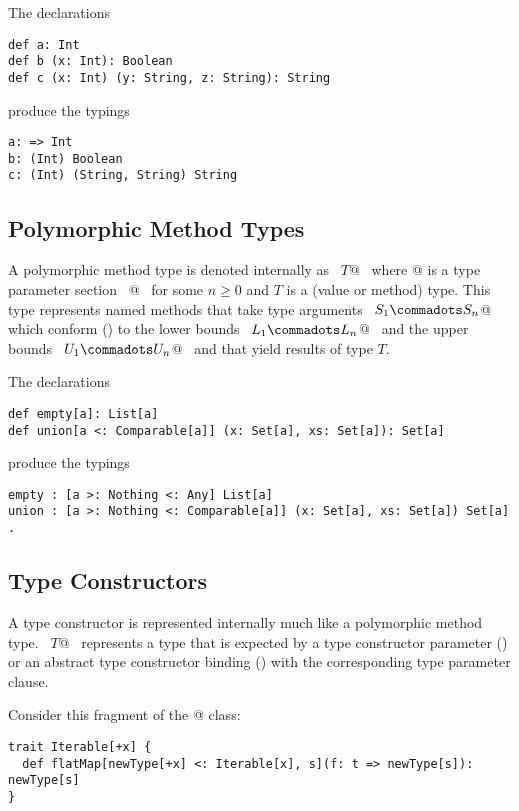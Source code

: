 \example The declarations
\begin{lstlisting}
def a: Int
def b (x: Int): Boolean
def c (x: Int) (y: String, z: String): String
\end{lstlisting}
produce the typings
\begin{lstlisting}
a: => Int
b: (Int) Boolean
c: (Int) (String, String) String
\end{lstlisting}

\subsection{Polymorphic Method Types}
\label{sec:poly-types}

A polymorphic method type is denoted internally as ~\lstinline@[$\tps\,$]$T$@~ where
\lstinline@[$\tps\,$]@ is a type parameter section 
~\lstinline@[$a_1$ >: $L_1$ <: $U_1 \commadots a_n$ >: $L_n$ <: $U_n$]@~ 
for some $n \geq 0$ and $T$ is a
(value or method) type.  This type represents named methods that
take type arguments ~\lstinline@$S_1 \commadots S_n$@~ which
conform () to the lower bounds
~\lstinline@$L_1 \commadots L_n$@~ and the upper bounds
~\lstinline@$U_1 \commadots U_n$@~ and that yield results of type $T$.

\example The declarations
\begin{lstlisting}
def empty[a]: List[a]
def union[a <: Comparable[a]] (x: Set[a], xs: Set[a]): Set[a]
\end{lstlisting}
produce the typings
\begin{lstlisting}
empty : [a >: Nothing <: Any] List[a]
union : [a >: Nothing <: Comparable[a]] (x: Set[a], xs: Set[a]) Set[a]  .
\end{lstlisting}

\subsection{Type Constructors} %
\label{sec:higherkinded-types}
A type constructor is represented internally much like a polymorphic method type.
~\lstinline@[$\pm$ $a_1$ >: $L_1$ <: $U_1 \commadots \pm a_n$ >: $L_n$ <: $U_n$] $T$@~ represents a type that is expected by a type constructor parameter () or an abstract type constructor binding () with the corresponding type parameter clause.

\example Consider this fragment of the \lstinline@Iterable[+x]@ class:
\begin{lstlisting}
trait Iterable[+x] {
  def flatMap[newType[+x] <: Iterable[x], s](f: t => newType[s]): newType[s]
}
\end{lstlisting}

